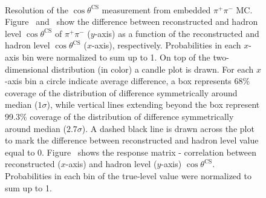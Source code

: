 \begin{figure}[h]
\parbox{0.4725\textwidth}{
  \centering
  \begin{subfigure}[b]{\linewidth}\addtocounter{subfigure}{-2}\vspace*{-12pt}
  \end{subfigure}\\
    \begin{minipage}[t][1.042\linewidth][t]{\linewidth}\vspace{10pt}
    \caption[Resolution of the $\cos\theta^{\text{CS}}$ measurement from embedded $\pi^{+}\pi^{-}$ MC.]{Resolution of the $\cos\theta^{\text{CS}}$ measurement from embedded $\pi^{+}\pi^{-}$ MC. Figure~ and~ show the difference between reconstructed and hadron level $\cos\theta^{\text{CS}}$ of $\pi^{+}\pi^{-}$ ($y$-axis) as a function of the reconstructed and hadron level $\cos\theta^{\text{CS}}$ ($x$-axis), respectively. Probabilities in each $x$-axis bin were normalized to sum up to 1. On top of the two-dimensional distribution (in color) a candle plot is drawn. For each $x$-axis bin a circle indicate average difference, a box represents 68\% coverage of the distribution of difference symmetrically around median ($1\sigma$), while vertical lines extending beyond the box represent 99.3\% coverage of the distribution of difference symmetrically around median ($2.7\sigma$). A dashed black line is drawn across the plot to mark the difference between reconstructed and hadron level value equal to 0. Figure~ shows the response matrix - correlation between reconstructed ($x$-axis) and hadron level ($y$-axis) $\cos\theta^{\text{CS}}$. Probabilities in each bin of the true-level value were normalized to sum up to 1.}\label{fig:Response_CosThetaCS}%
  \end{minipage}
}%
\end{figure}


